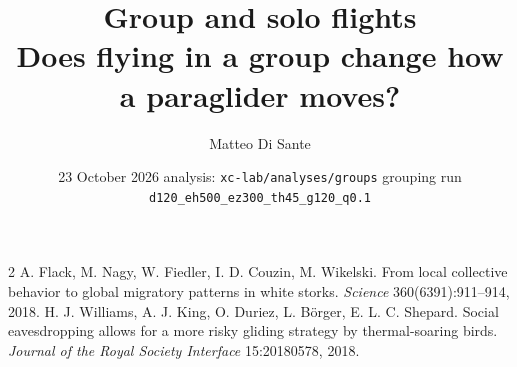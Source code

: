 \documentclass[10pt,a4paper]{article}
\title{\textbf{Group and solo flights}\\[2pt]
  \large Does flying in a group change how a paraglider moves?}
\author{Matteo Di Sante}
\date{23 October 2026 \;\textbullet\; analysis: \texttt{xc-lab/analyses/groups} \;\textbullet\;
  grouping run \texttt{d120\_eh500\_ez300\_th45\_g120\_q0.1}}
\begin{document}
\maketitle













\begin{thebibliography}{2}\small
{} A. Flack, M. Nagy, W. Fiedler, I. D. Couzin, M. Wikelski. From local collective
behavior to global migratory patterns in white storks. \emph{Science} 360(6391):911--914, 2018.
 H. J. Williams, A. J. King, O. Duriez, L. Börger, E. L. C. Shepard. Social
eavesdropping allows for a more risky gliding strategy by thermal-soaring birds. \emph{Journal of
the Royal Society Interface} 15:20180578, 2018.
\end{thebibliography}

\clearpage
\appendix

\end{document}
